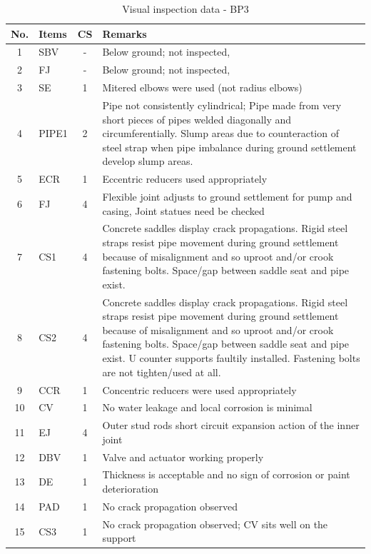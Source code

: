 \begin{table}[!h]
	\caption{Visual inspection data - BP3}
	\label{ch04_visualinspectionbp3}
		{\scriptsize
\begin{tabular}{c|l|c|p{12cm}}
\hline
No. & Items & CS & Remarks \\ 
\hline
1 & SBV & - & Below ground; not inspected,  \\ 
2 & FJ & - & Below ground; not inspected, \\ 
3 & SE & 1 & Mitered elbows were used (not radius elbows) \\ 
4 & PIPE1 & 2 & Pipe not consistently cylindrical; Pipe made from very short pieces of pipes welded diagonally and circumferentially. Slump areas due to counteraction of steel strap when pipe imbalance during ground settlement develop slump areas. \\ 
5 & ECR & 1 & Eccentric reducers used appropriately \\ 
6 & FJ & 4 & Flexible joint adjusts to ground settlement for pump and casing, Joint statues need be checked \\ 
7 & CS1 & 4 & Concrete saddles display crack propagations. Rigid steel straps resist pipe movement during ground settlement because of misalignment and so uproot and/or crook fastening bolts. Space/gap between saddle seat and pipe exist. \\ 
8 & CS2 & 4 & Concrete saddles display crack propagations. Rigid steel straps resist pipe movement during ground settlement because of misalignment and so uproot and/or crook fastening bolts. Space/gap between saddle seat and pipe exist. U counter supports faultily installed. Fastening bolts are not tighten/used at all. \\ 
9 & CCR & 1 & Concentric reducers were used appropriately \\ 
10 & CV & 1 & No water leakage and local corrosion is minimal \\ 
11 & EJ & 4 & Outer stud rods short circuit expansion action of the inner joint \\ 
12 & DBV & 1 & Valve and actuator working properly  \\ 
13 & DE & 1 & Thickness is acceptable and no sign of corrosion or paint deterioration \\ 
14 & PAD & 1 & No crack propagation observed \\ 
15 & CS3 & 1 & No crack propagation observed; CV sits well on the support  \\ 
\hline
\end{tabular}
	}
\end{table}



